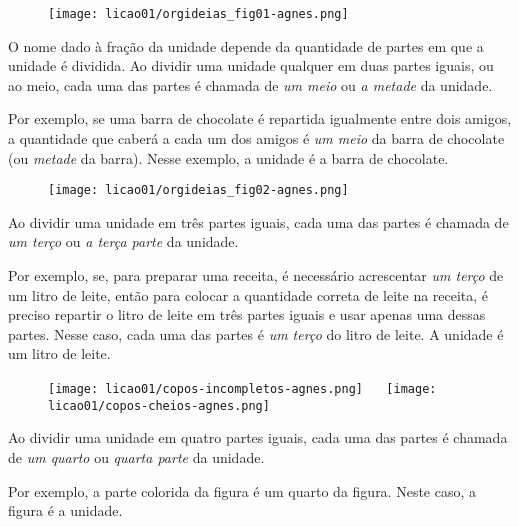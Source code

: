 \begin{figure}[H]
\centering

\texttt{[image: licao01/orgideias\_fig01-agnes.png]}
\end{figure}


O nome dado à fração da unidade depende da quantidade de partes em que a unidade é dividida. Ao dividir uma unidade qualquer em duas partes iguais, ou ao meio, cada uma das partes é chamada de \textit{um meio} ou \textit{a metade} da unidade.

Por exemplo, se uma barra de chocolate é repartida igualmente entre dois amigos, a quantidade que caberá a cada um dos amigos é \textit{um meio} da barra de chocolate (ou \textit{metade} da barra). Nesse exemplo, a unidade é a barra de chocolate.


\begin{figure}[H]
\centering

\texttt{[image: licao01/orgideias\_fig02-agnes.png]}
\end{figure}


Ao dividir uma unidade em três partes iguais, cada uma das partes é chamada de \textit{um terço} ou \textit{a terça parte} da unidade.

Por exemplo, se, para preparar uma receita, é necessário acrescentar \textit{um ter\-ço} de um litro de leite, então para colocar a quantidade correta de leite na receita, é preciso repartir o litro de leite em três partes iguais e usar apenas uma dessas partes. Nesse caso, cada uma das partes é \textit{um terço} do litro de leite. A unidade é um litro de leite.


\begin{figure}[H]
\centering

\texttt{[image: licao01/copos-incompletos-agnes.png]} $\quad$ \texttt{[image: licao01/copos-cheios-agnes.png]}
\end{figure}


Ao dividir uma unidade em quatro partes iguais, cada uma das partes é chamada de \textit{um quarto} ou \textit{quarta parte} da unidade.

Por exemplo, a parte colorida da figura é um quarto da figura. Neste caso, a figura é a unidade.


\begin{figure}[H]
\centering

\end{figure}


